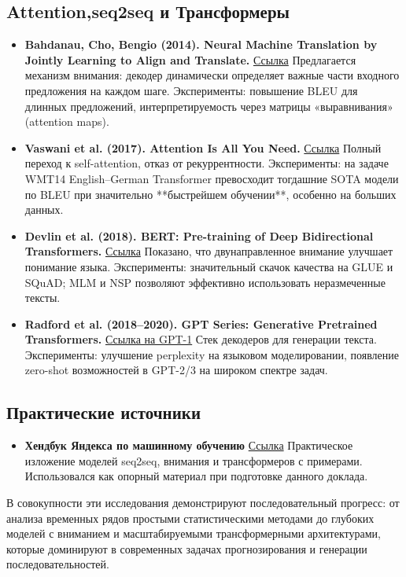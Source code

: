 \documentclass[12pt,a4paper]{article}
\begin{document}
\subsection{Attention,seq2seq и Трансформеры}
\begin{itemize}
  \item \textbf{Bahdanau, Cho, Bengio (2014). Neural Machine Translation by Jointly Learning to Align and Translate.}
  \href{https://arxiv.org/abs/1409.0473}{Ссылка}
  Предлагается механизм внимания: декодер динамически определяет важные части входного предложения на каждом шаге.
  Эксперименты: повышение BLEU для длинных предложений, интерпретируемость через матрицы «выравнивания» (attention maps).
  \item \textbf{Vaswani et al. (2017). Attention Is All You Need.}
  \href{https://arxiv.org/abs/1706.03762}{Ссылка}
  Полный переход к self-attention, отказ от рекуррентности.
  Эксперименты: на задаче WMT14 English–German Transformer превосходит тогдашние SOTA модели по BLEU при значительно **быстрейшем обучении**, особенно на больших данных.

  \item \textbf{Devlin et al. (2018). BERT: Pre-training of Deep Bidirectional Transformers.}
  \href{https://arxiv.org/abs/1810.04805}{Ссылка}
  Показано, что двунаправленное внимание улучшает понимание языка.
  Эксперименты: значительный скачок качества на GLUE и SQuAD; MLM и NSP позволяют эффективно использовать неразмеченные тексты.

  \item \textbf{Radford et al. (2018–2020). GPT Series: Generative Pretrained Transformers.}
  \href{https://cdn.openai.com/research-covers/language-unsupervised/language_understanding_paper.pdf}{Ссылка на GPT-1}
  Стек декодеров для генерации текста.
  Эксперименты: улучшение perplexity на языковом моделировании, появление zero-shot возможностей в GPT-2/3 на широком спектре задач.
\end{itemize}

\subsection{Практические источники}
\begin{itemize}
  \item \textbf{Хендбук Яндекса по машинному обучению}
  \href{https://education.yandex.ru/handbook/ml}{Ссылка}
  Практическое изложение моделей seq2seq, внимания и трансформеров с примерами. Использовался как опорный материал при подготовке данного доклада.
\end{itemize}

В совокупности эти исследования демонстрируют последовательный прогресс: от анализа временных рядов простыми статистическими методами до глубоких моделей с вниманием и масштабируемыми трансформерными архитектурами, которые доминируют в современных задачах прогнозирования и генерации последовательностей.
\end{document}
